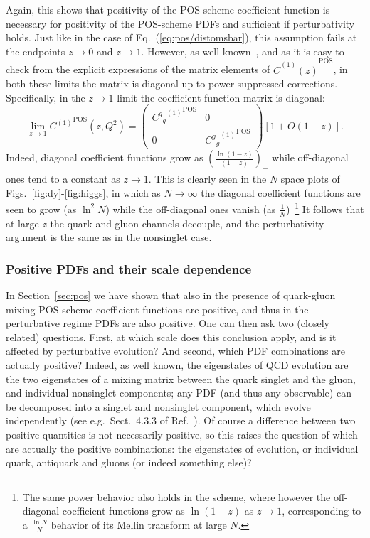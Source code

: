 Again, this shows that positivity of the POS-scheme  coefficient function is
necessary for positivity of the POS-scheme PDFs and sufficient if
perturbativity holds. Just like in the case of
Eq.~(\ref{eq:pos/distomsbar}), this assumption fails at the endpoints
$z\to0$ and $z\to 1$. However, as well known~\cite{Ellis:1991qj}, and
as it is easy to check from the explicit expressions of the matrix
elements of ${\bar
    C^{(1)}(z)}^{\textrm{POS}}$, in both these limits the matrix
  is diagonal up to power-suppressed corrections. Specifically, 
 in the $z\to1$ limit the coefficient function matrix is diagonal:
\begin{equation}\label{eq:pos/diag}
    \lim_{z\to 1}  {C^{(1)}}^{\textrm{POS}}(z,Q^2)=\left(\begin{array}{cc} {{{C^{q}}_q}^{(1)}}^{\textrm{POS}} &
      0 \\0 & {{{C^{g}}_g}^{(1)}}^{\textrm{POS}} \end{array}\right)\left[1+O(1-z)\right].
\end{equation}
Indeed, diagonal coefficient functions grow as
$\left(\frac{\ln(1-z)}{(1-z)}\right)_+$ while off-diagonal ones tend to a constant
as $z\to1$. This is clearly seen in the $N$ space plots of
Figs.~\ref{fig:dy}-\ref{fig:higgs}, in which as $N\to\infty$ the diagonal coefficient
functions are seen to grow (as $\ln^2N$) while the off-diagonal ones
vanish (as $\frac{1}{N}$)~\footnote{The same power behavior also
  holds in the \msbar{} scheme, where however the off-diagonal
  coefficient functions grow as $\ln(1-z)$ as $z\to 1$, corresponding
  to a $\frac{\ln N}{N}$ behavior of its Mellin transform at large $N$.}
It follows that at large $z$ the quark and gluon channels decouple, and
the perturbativity argument is the same as in the
nonsinglet case. 

\subsubsection{Positive PDFs and their scale dependence}
\label{sec:ap}


In Section~\ref{sec:pos}
we have shown that also in the presence of quark-gluon
mixing  POS-scheme
coefficient functions are positive, and thus in the perturbative
regime PDFs are also positive. One can then ask two (closely related)
questions. First, at which scale does this conclusion apply, and is it
affected by perturbative evolution? And second, which PDF combinations
are actually positive?
Indeed, as well known, the eigenstates of QCD evolution are the two
eigenstates of a mixing matrix between the quark singlet and the
gluon,  and individual nonsinglet components; any PDF (and thus any
observable) can be decomposed into a singlet and nonsinglet component,
which evolve independently (see
e.g.\ Sect.~4.3.3 of Ref.~\cite{Ellis:1991qj}). Of course a difference
between two positive quantities is not necessarily positive, so this
raises the question of which are actually the positive combinations:
the eigenstates of evolution, or individual quark, antiquark and
gluons (or indeed something else)?

